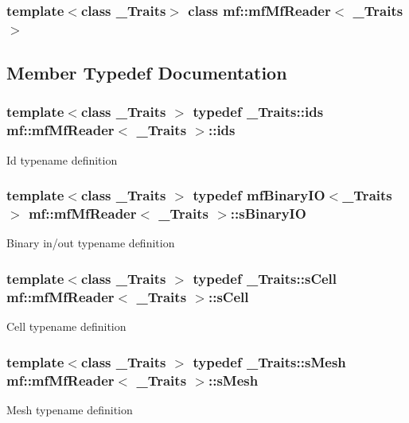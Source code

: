 \subsubsection*{template$<$class \_\-Traits$>$ class mf::mfMfReader$<$ \_\-Traits $>$}



\subsection{Member Typedef Documentation}
\hypertarget{classmf_1_1mfMfReader_ace0c24e773b00ea08ddc459d747f4b0b}{
\subsubsection[{ids}]{\setlength{\rightskip}{0pt plus 5cm}template$<$class \_\-Traits $>$ typedef \_\-Traits::ids {\bf mf::mfMfReader}$<$ \_\-Traits $>$::{\bf ids}}}
\label{classmf_1_1mfMfReader_ace0c24e773b00ea08ddc459d747f4b0b}
Id typename definition \hypertarget{classmf_1_1mfMfReader_a2709026b1c067b6d0e14ed23fdb23a2d}{
\subsubsection[{sBinaryIO}]{\setlength{\rightskip}{0pt plus 5cm}template$<$class \_\-Traits $>$ typedef {\bf mfBinaryIO}$<$\_\-Traits$>$ {\bf mf::mfMfReader}$<$ \_\-Traits $>$::{\bf sBinaryIO}}}
\label{classmf_1_1mfMfReader_a2709026b1c067b6d0e14ed23fdb23a2d}
Binary in/out typename definition \hypertarget{classmf_1_1mfMfReader_ad706d4b18bc925ccb011c9973c108dc9}{
\subsubsection[{sCell}]{\setlength{\rightskip}{0pt plus 5cm}template$<$class \_\-Traits $>$ typedef \_\-Traits::sCell {\bf mf::mfMfReader}$<$ \_\-Traits $>$::{\bf sCell}}}
\label{classmf_1_1mfMfReader_ad706d4b18bc925ccb011c9973c108dc9}
Cell typename definition \hypertarget{classmf_1_1mfMfReader_a12c6ee10508f5805b2cddc729407a1f3}{
\subsubsection[{sMesh}]{\setlength{\rightskip}{0pt plus 5cm}template$<$class \_\-Traits $>$ typedef \_\-Traits::sMesh {\bf mf::mfMfReader}$<$ \_\-Traits $>$::{\bf sMesh}}}
\label{classmf_1_1mfMfReader_a12c6ee10508f5805b2cddc729407a1f3}
Mesh typename definition 

